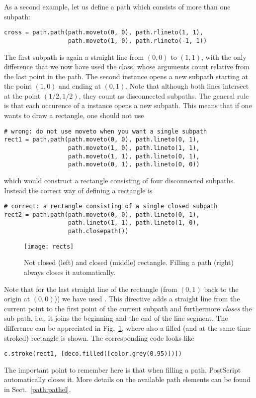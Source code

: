 As a second example, let us define a path which consists of more than 
one subpath:
\begin{verbatim}
cross = path.path(path.moveto(0, 0), path.rlineto(1, 1),
                  path.moveto(1, 0), path.rlineto(-1, 1))
\end{verbatim}
The first subpath is again a straight line from $(0, 0)$ to $(1, 1)$,
with the only difference that we now have used the 
class, whose arguments count relative from the last point in the path.
The second  instance opens a new subpath starting at the
point $(1, 0)$ and ending at $(0, 1)$. Note that although both lines
intersect at the point $(1/2, 1/2)$, they count as disconnected
subpaths.  The general rule is that each occurence of a 
instance opens a new subpath. This means that if one wants to draw a
rectangle, one should not use
\begin{verbatim}
# wrong: do not use moveto when you want a single subpath
rect1 = path.path(path.moveto(0, 0), path.lineto(0, 1),
                  path.moveto(1, 0), path.lineto(1, 1),
                  path.moveto(1, 1), path.lineto(0, 1),
                  path.moveto(0, 1), path.lineto(0, 0))
\end{verbatim}
which would construct a rectangle consisting of four disconnected
subpaths. Instead the correct way of defining a rectangle is 
\begin{verbatim}
# correct: a rectangle consisting of a single closed subpath
rect2 = path.path(path.moveto(0, 0), path.lineto(0, 1), 
                  path.lineto(1, 1), path.lineto(1, 0),
                  path.closepath())
\end{verbatim}
%
\begin{figure}
\centerline{\texttt{[image: rects]}}
\caption{Not closed (left) and closed (middle) rectangle. Filling a
  path (right) always closes it automatically.}
\label{fig:rects}
\end{figure}
Note that for the last straight line of the rectangle (from $(0, 1)$
back to the origin at $(0, 0)$)) we have used .  This
directive adds a straight line from the current point to the first
point of the current subpath and furthermore \textit{closes} the sub
path, i.e., it joins the beginning and the end of the line segment.
The difference can be appreciated in Fig.~\ref{fig:rects}, where
also a filled (and at the same time stroked) rectangle is shown.
The corresponding code looks like
\begin{verbatim}
c.stroke(rect1, [deco.filled([color.grey(0.95)])])
\end{verbatim}
The important point to remember here is that when filling a path,
PostScript automatically closes it.  More details on the available
path elements can be found in Sect.~\ref{path:pathel}.

